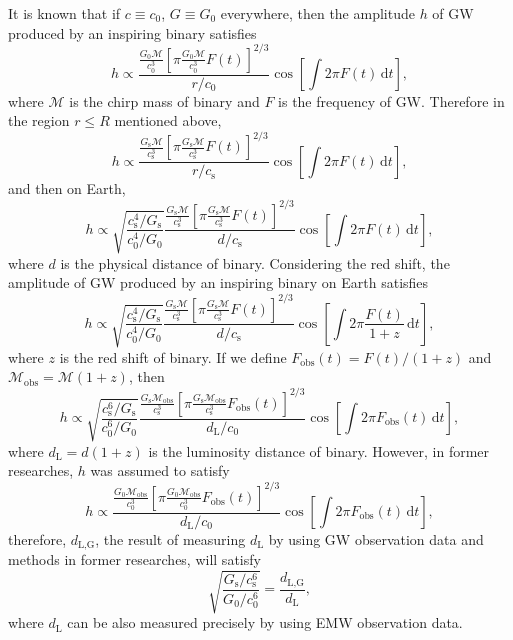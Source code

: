 \documentclass{article}
\def\d{\mathrm{d}}
\begin{document}
It is known that if $c\equiv c_0$, $G\equiv G_0$ everywhere, then the amplitude $h$ of GW produced by an inspiring binary satisfies
\begin{equation}
    h\propto\frac{\frac{G_0\mathcal{M}}{c_0^3}[\pi \frac{G_0\mathcal{M}}{c_0^3}F(t)]^{2/3}}{r/c_0}\cos[\int 2\pi F(t)\,\d t],
\end{equation}
where $\mathcal{M}$ is the chirp mass of binary and $F$ is the frequency of GW. Therefore in the region $r\leq R$ mentioned above,
\begin{equation}
    h\propto\frac{\frac{G_\text{s}\mathcal{M}}{c_\text{s}^3}[\pi \frac{G_\text{s}\mathcal{M}}{c_\text{s}^3}F(t)]^{2/3}}{r/c_\text{s}}\cos[\int 2\pi F(t)\,\d t],
\end{equation}
and then on Earth,
\begin{equation}
    h\propto\sqrt{\frac{c_\text{s}^4/G_\text{s}}{c_0^4/G_0}}\frac{\frac{G_\text{s}\mathcal{M}}{c_\text{s}^3}[\pi \frac{G_\text{s}\mathcal{M}}{c_\text{s}^3}F(t)]^{2/3}}{d/c_\text{s}}\cos[\int 2\pi F(t)\,\d t],
\end{equation}
where $d$ is the physical distance of binary. Considering the red shift, the amplitude of GW produced by an inspiring binary on Earth satisfies
\begin{equation}
    h\propto\sqrt{\frac{c_\text{s}^4/G_\text{s}}{c_0^4/G_0}}\frac{\frac{G_\text{s}\mathcal{M}}{c_\text{s}^3}[\pi \frac{G_\text{s}\mathcal{M}}{c_\text{s}^3}F(t)]^{2/3}}{d/c_\text{s}}\cos[\int 2\pi \frac{F(t)}{1+z}\,\d t],
\end{equation}
where $z$ is the red shift of binary. If we define $F_\text{obs}(t)=F(t)/(1+z)$ and $\mathcal{M}_\text{obs}=\mathcal{M}(1+z)$, then
\begin{equation}
    h\propto\sqrt{\frac{c_\text{s}^6/G_\text{s}}{c_0^6/G_0}}\frac{\frac{G_\text{s}\mathcal{M}_\text{obs}}{c_\text{s}^3}[\pi \frac{G_\text{s}\mathcal{M}_\text{obs}}{c_\text{s}^3}F_\text{obs}(t)]^{2/3}}{d_\text{L}/c_0}\cos[\int 2\pi F_\text{obs}(t)\,\d t],
\end{equation}
where $d_\text{L}=d(1+z)$ is the luminosity distance of binary. However, in former researches, $h$ was assumed to satisfy
\begin{equation}
    h\propto\frac{\frac{G_0\mathcal{M}_\text{obs}}{c_0^3}[\pi \frac{G_0\mathcal{M}_\text{obs}}{c_0^3}F_\text{obs}(t)]^{2/3}}{d_\text{L}/c_0}\cos[\int 2\pi F_\text{obs}(t)\,\d t],
\end{equation}
therefore, $d_\text{L,G}$, the result of measuring $d_\text{L}$ by using GW observation data and methods in former researches, will satisfy
\begin{equation}
    \sqrt{\frac{G_\text{s}/c_\text{s}^6}{G_0/c_0^6}}=\frac{d_\text{L,G}}{d_\text{L}},
\end{equation}
where $d_\text{L}$ can be also measured precisely by using EMW observation data.
\end{document}
